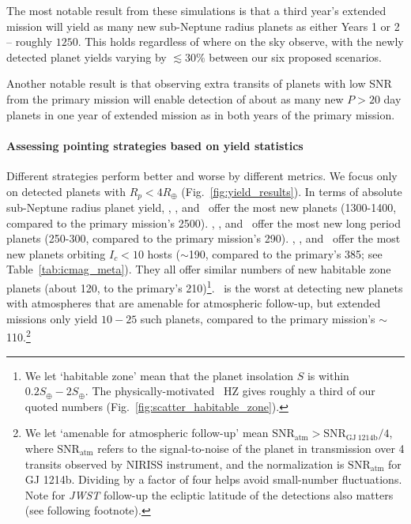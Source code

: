 The most notable result from these simulations is that a third year's extended mission will yield as many new sub-Neptune radius planets as either Years 1 or 2 -- roughly $1250$.
This holds regardless of where on the sky observe, with the newly detected planet yields varying by $\lesssim 30\%$ between our six proposed scenarios.

Another notable result is that observing extra transits of planets with low SNR from the primary mission will enable detection of about as many new $P>20$ day planets in one year of \tesss extended mission as in both years of the primary mission.

\paragraph{Assessing pointing strategies based on yield statistics} 
Different strategies perform better and worse by different metrics.
We focus only on detected planets with $R_p<4R_\oplus$ (Fig.~\ref{fig:yield_results}).
In terms of absolute sub-Neptune radius planet yield, \hemis, \npole, and \shemiAvoid\ offer the most new planets (1300-1400, compared to the primary mission's 2500).
\hemis, \npole, and \nhemi\ offer the most new long period planets (250-300, compared to the primary mission's 290).
\hemis, \shemiAvoid, and \eshort\ offer the most new planets orbiting $I_c<10$ hosts ($\sim$190, compared to the primary's 385; see Table~\ref{tab:icmag_meta}).
They all offer similar numbers of new habitable zone planets (about 120, to the primary's 210)\footnote{We let `habitable zone' mean that the planet insolation $S$ is within $0.2S_\oplus-2S_\oplus$. The physically-motivated~\protect\citet{kopparapu_habitable_2013} HZ gives roughly a third of our quoted numbers (Fig.~\protect\ref{fig:scatter_habitable_zone}).}.
\npole\ is the worst at detecting new planets with atmospheres that are amenable for atmospheric follow-up, but extended missions only yield $10-25$ such planets, compared to the primary mission's $\sim$110.\footnote{We let `amenable for atmospheric follow-up' mean $\mathrm{SNR}_\mathrm{atm} > \mathrm{SNR}_\mathrm{GJ\ 1214b}/4 $, where $\mathrm{SNR}_\mathrm{atm}$ refers to the signal-to-noise of the planet in transmission over 4 transits observed by \jwsts NIRISS instrument, and the normalization is $\mathrm{SNR}_\mathrm{atm}$ for GJ 1214b. Dividing by a factor of four helps avoid small-number fluctuations. Note for \textit{JWST} follow-up the ecliptic latitude of the detections also matters (see following footnote).}

